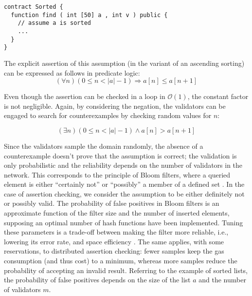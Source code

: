 \begin{lstlisting}[caption=Smart contract expecting a sorted array \cite{thiemann_2020}, numbers=none, language=Solidity, label=lst:sorted]
contract Sorted {
  function find ( int [50] a , int v ) public {
    // assume a is sorted
    ...
  }
}
\end{lstlisting}

The explicit assertion of this assumption (in the variant of an ascending sorting) can be expressed as follows in predicate logic:
\begin{equation}\label{eq:sorted}
	(\forall n) (0 \leq n < |a| - 1) \Rightarrow a[n] \leq a[n+1]
\end{equation}

Even though the assertion can be checked in a loop in $\mathcal{O}(1)$, the constant factor is not negligible. Again, by considering the negation, the validators can be engaged to search for counterexamples by checking random values for $n$:
 
\begin{equation}\label{eq:sorted_neg}
	(\exists n) (0 \leq n < |a| - 1) \wedge a[n] > a[n+1]
\end{equation}

Since the validators sample the domain randomly, the absence of a counterexample doesn't prove that the assumption is correct; the validation is only probabilistic and the reliability depends on the number of validators in the network. This corresponds to the principle of Bloom filters, where a queried element is either ``certainly not'' or ``possibly'' a member of a defined set \cite{blustein_bloom_2002}. In the case of assertion checking, we consider the assumption to be either definitely not or possibly valid. The probability of false positives in Bloom filters is an approximate function of the filter size and the number of inserted elements, supposing an optimal number of hash functions have been implemented. Tuning these parameters is a trade-off between making the filter more reliable, i.e., lowering its error rate, and space efficiency \cite{blustein_bloom_2002}. The same applies, with some reservations, to distributed assertion checking: fewer samples keep the gas consumption (and thus cost) to a minimum, whereas more samples reduce the probability of accepting an invalid result. Referring to the example of sorted lists, the probability of false positives depends on the size of the list $a$ and the number of validators $m$.

